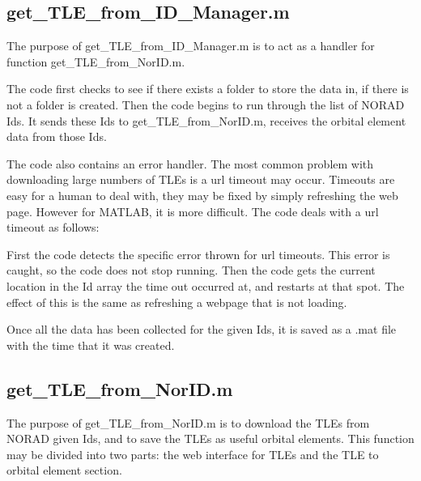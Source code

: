 \documentclass[12pt]{report}
\begin{document}
		
		\subsection{get\_TLE\_from\_ID\_Manager.m}
		The purpose of get\_TLE\_from\_ID\_Manager.m is to act as a handler for function \newline get\_TLE\_from\_NorID.m. 
		
		The code first checks to see if there exists a folder to store the data in, if there is not a folder is created. Then the code begins to run through the list of NORAD Ids. It sends these Ids to get\_TLE\_from\_NorID.m, receives the orbital element data from those Ids. 
		
		The code also contains an error handler. The most common problem with downloading large numbers of TLEs is a url timeout may occur. Timeouts are easy for a human to deal with, they may be fixed by simply refreshing the web page. However for MATLAB, it is more difficult. The code deals with a url timeout as follows:
		
		First the code detects the specific error thrown for url timeouts. This error is caught, so the code does not stop running. Then the code gets the current location in the Id array the time out occurred at, and restarts at that spot. The effect of this is the same as refreshing a webpage that is not loading. 
		
		Once all the data has been collected for the given Ids, it is saved as a .mat file with the time that it was created.
		\subsection{get\_TLE\_from\_NorID.m}
		The purpose of get\_TLE\_from\_NorID.m is to download the TLEs from NORAD given Ids, and to save the TLEs as useful orbital elements. This function may be divided into two parts: the web interface for TLEs and the TLE to orbital element section. 
		
\end{document}
